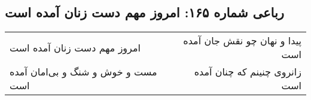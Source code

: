 \begin{center}
\section*{رباعی شماره ۱۶۵: امروز مهم دست زنان آمده است}
\label{sec:0165}
\begin{longtable}{l p{0.5cm} r}
امروز مهم دست زنان آمده است
&&
پیدا و نهان چو نقش جان آمده است
\\
مست و خوش و شنگ و بی‌امان آمده است
&&
زانروی چنینم که چنان آمده است
\\
\end{longtable}
\end{center}
